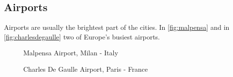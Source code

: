 \subsection{Airports}
Airports are usually the brightest part of the cities. In \autoref{fig:malpensa} and in \autoref{fig:charlesdegaulle} two of Europe's busiest airports.
\begin{figure}[h!]
    \centering
    \qquad
    \caption{Malpensa Airport, Milan - Italy}%
    \label{fig:malpensa}
\end{figure}
\begin{figure}[h!]
    \centering
    \qquad
    \caption{Charles De Gaulle Airport, Paris - France}%
    \label{fig:charlesdegaulle}
\end{figure}
